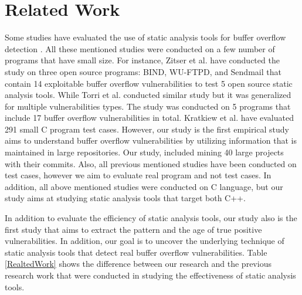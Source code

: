 \section{Related Work}
Some studies have evaluated the use of static analysis tools for buffer overflow detection  \cite{Zitser2004}  \cite{Torri2010}  \cite{Kratkiewicz2005}. All these mentioned studies were conducted on a few number of programs that have small size.  For instance, Zitser et al. have conducted the study on three open source programs: BIND, WU-FTPD, and Sendmail that contain 14 exploitable buffer overflow vulnerabilities to test 5 open source static analysis tools. While Torri et al. conducted similar study but it was generalized for multiple vulnerabilities types. The study was conducted on 5 programs that include 17 buffer overflow vulnerabilities in total. Kratkiew et al. have evaluated 291 small C program test cases.  However, our study  is the first empirical study aims to understand buffer overflow vulnerabilities by utilizing information that is maintained in large repositories. Our study, included mining 40 large projects with their commits. Also, all previous mentioned studies have been conducted on test cases, however we aim to evaluate real program and not test cases. In addition, all above mentioned studies were conducted on C language, but our study aims at studying static analysis tools that target both C++. 

In addition to evaluate the efficiency of static analysis tools, our study also is the first study that aims to extract the pattern and the age of true positive vulnerabilities. In addition, our goal is to uncover the underlying technique of static analysis tools that detect real buffer overflow vulnerabilities. Table \ref{RealtedWork} shows the difference between our research and the previous research work that were conducted in studying the effectiveness of static analysis tools. 



